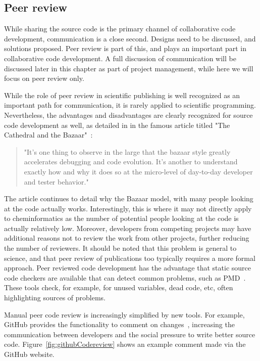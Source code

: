 \documentclass[11pt]{book}
\begin{document}
\subsection{Peer review}

While sharing the source code is the primary channel of collaborative
code development, communication is a close second. Designs
need to be discussed, and solutions proposed. Peer review
is part of this, and plays an important part in collaborative
code development. A full discussion of communication
will be discussed later in this chapter as part of project
management, while here we will focus on peer review only.

While the role of peer review in scientific publishing is
well recognized as an important path for communication, it is rarely
applied to scientific programming. Nevertheless, the
advantages and disadvantages are clearly recognized for source
code development as well, as detailed in
in the famous article titled "The Cathedral and the Bazaar"~\cite{Raymond2001}:

\begin{quotation}
"It's one thing to observe in the large that the bazaar style
greatly accelerates debugging and code evolution. It's
another to understand exactly how and why it does so at the
micro-level of day-to-day developer and tester behavior."
\end{quotation}

The article continues to detail why the Bazaar model, with many
people looking at the code actually works. Interestingly,
this is where it may not directly apply to cheminformatics as
the number of potential people looking at the code is actually
relatively low. Moreover, developers from competing projects
may have additional reasons not to review the work from other
projects, further reducing the number of reviewers. 
It should be noted that this problem is general to science,
and that peer review of publications too typically requires
a more formal approach. Peer reviewed code development 
has the advantage
that static source code checkers are available that can
detect common problems, such as PMD~\cite{url:pmd}.
These tools check, for example, for unused variables, dead
code, etc, often highlighting sources of problems.

Manual peer code review is increasingly simplified by new
tools. For example, GitHub provides the functionality to
comment on changes~\cite{Chemblaics201005CodeReview},
increasing the communication between developers and the
social pressure to write better source code.
Figure~\ref{fig:githubCodereview} shows an example comment
made via the GitHub website.
\end{document}
